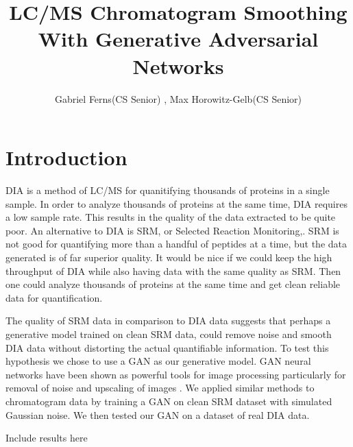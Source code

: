 \documentclass[12pt]{article}
\title{LC/MS Chromatogram Smoothing With Generative Adversarial Networks}
\author{Gabriel Ferns(CS Senior) , Max Horowitz-Gelb(CS Senior)}
\begin{document}
\maketitle


\section{Introduction}
DIA \cite{DIA} is a method of LC/MS for quanitifying thousands of proteins in a single sample. In order to analyze thousands of proteins at the same time, DIA requires a low sample rate. This results in the quality of the data extracted to be quite poor. An alternative to DIA is SRM, or Selected Reaction Monitoring,\cite{SRM}. SRM is not good for quantifying more than a handful of peptides at a time, but the data generated is of far superior quality. It would be nice if we could keep the high throughput of DIA while also having data with the same quality as SRM. Then one could analyze thousands of proteins at the same time and get clean reliable data for quantification.

The quality of SRM data in comparison to DIA data suggests that perhaps a generative model trained on clean SRM data, could remove noise and smooth DIA data without distorting the actual quantifiable information. To test this hypothesis we chose to use a GAN as our generative model. GAN neural networks have been shown as powerful tools for image processing particularly for removal of noise and upscaling of images \cite{SRGAN}\cite{DE_RAIN}. We applied similar methods to chromatogram data by training a GAN on clean SRM dataset with simulated Gaussian noise. We then tested our GAN on a dataset of real DIA data.

\color{red}
Include results here
\color{black}
\end{document}
